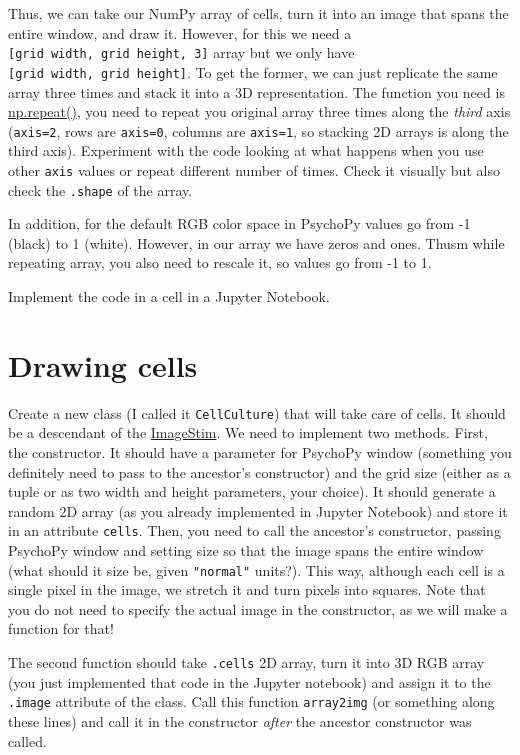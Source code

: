 \documentclass[
]{book}
\begin{document}
Thus, we can take our NumPy array of cells, turn it into an image that spans the entire window, and draw it. However, for this we need a \texttt{{[}grid\ width,\ grid\ height,\ 3{]}} array but we only have \texttt{{[}grid\ width,\ grid\ height{]}}. To get the former, we can just replicate the same array three times and stack it into a 3D representation. The function you need is \href{https://numpy.org/doc/stable/reference/generated/numpy.repeat.html}{np.repeat()}, you need to repeat you original array three times along the \emph{third} axis (\texttt{axis=2}, rows are \texttt{axis=0}, columns are \texttt{axis=1}, so stacking 2D arrays is along the third axis). Experiment with the code looking at what happens when you use other \texttt{axis} values or repeat different number of times. Check it visually but also check the \texttt{.shape} of the array.

In addition, for the default RGB color space in PsychoPy values go from -1 (black) to 1 (white). However, in our array we have zeros and ones. Thusm while repeating array, you also need to rescale it, so values go from -1 to 1.

Implement the code in a cell in a Jupyter Notebook.

\hypertarget{drawing-cells}{%
\section{Drawing cells}\label{drawing-cells}}

Create a new class (I called it \texttt{CellCulture}) that will take care of cells. It should be a descendant of the \href{https://psychopy.org/api/visual/imagestim.html}{ImageStim}. We need to implement two methods. First, the constructor. It should have a parameter for PsychoPy window (something you definitely need to pass to the ancestor's constructor) and the grid size (either as a tuple or as two width and height parameters, your choice). It should generate a random 2D array (as you already implemented in Jupyter Notebook) and store it in an attribute \texttt{cells}. Then, you need to call the ancestor's constructor, passing PsychoPy window and setting size so that the image spans the entire window (what should it size be, given \texttt{"normal"} units?). This way, although each cell is a single pixel in the image, we stretch it and turn pixels into squares. Note that you do not need to specify the actual image in the constructor, as we will make a function for that!

The second function should take \texttt{.cells} 2D array, turn it into 3D RGB array (you just implemented that code in the Jupyter notebook) and assign it to the \texttt{.image} attribute of the class. Call this function \texttt{array2img} (or something along these lines) and call it in the constructor \emph{after} the ancestor constructor was called.
\end{document}
